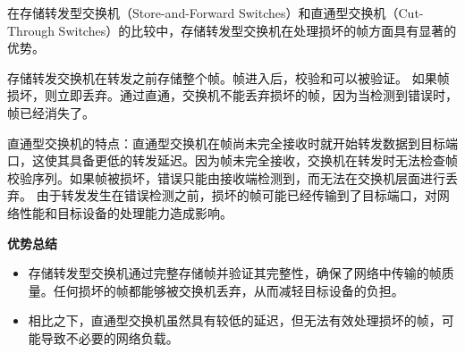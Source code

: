 在存储转发型交换机（Store-and-Forward Switches）和直通型交换机（Cut-Through Switches）的比较中，存储转发型交换机在处理损坏的帧方面具有显著的优势。

存储转发交换机在转发之前存储整个帧。帧进入后，校验和可以被验证。
如果帧损坏，则立即丢弃。通过直通，交换机不能丢弃损坏的帧，因为当检测到错误时，帧已经消失了。

直通型交换机的特点：直通型交换机在帧尚未完全接收时就开始转发数据到目标端口，这使其具备更低的转发延迟。因为帧未完全接收，交换机在转发时无法检查帧校验序列。如果帧被损坏，错误只能由接收端检测到，而无法在交换机层面进行丢弃。
由于转发发生在错误检测之前，损坏的帧可能已经传输到了目标端口，对网络性能和目标设备的处理能力造成影响。

\vspace{0.5cm}

\textbf{优势总结}

\begin{itemize}
    \item 存储转发型交换机通过完整存储帧并验证其完整性，确保了网络中传输的帧质量。任何损坏的帧都能够被交换机丢弃，从而减轻目标设备的负担。
    \item 相比之下，直通型交换机虽然具有较低的延迟，但无法有效处理损坏的帧，可能导致不必要的网络负载。
\end{itemize}


